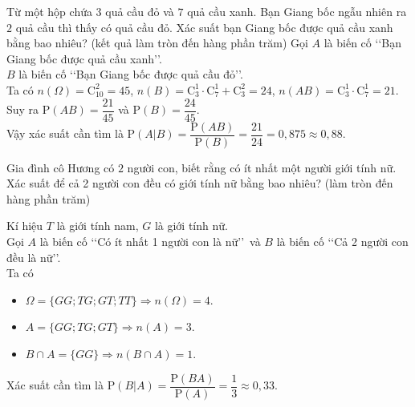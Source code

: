 \begin{bt}%
	Từ một hộp chứa $3$ quả cầu đỏ và $7$ quả cầu xanh. Bạn Giang bốc ngẫu nhiên ra $2$ quả cầu thì thấy có quả cầu đỏ. Xác suất bạn Giang bốc được quả cầu xanh bằng bao nhiêu? (kết quả làm tròn đến hàng phần trăm)
	\loigiai
	{
		Gọi $A$ là biến cố \lq\lq Bạn Giang bốc được quả cầu xanh\rq\rq.\\
		$B$ là biến cố \lq\lq Bạn Giang bốc được quả cầu đỏ\rq\rq.\\
		Ta có $n(\Omega)= \mathrm{C}_{10}^2=45$, $n(B)= \mathrm{C}_3^1 \cdot \mathrm{C}_7^1 + \mathrm{C}_3^2= 24$, $n(AB)= \mathrm{C}_3^1\cdot \mathrm{C}_7^1=21$.\\
		Suy ra $\mathrm{P}(AB)= \dfrac{21}{45}$ và $\mathrm{P}(B)= \dfrac{24}{45}$.\\
		Vậy xác suất cần tìm là $\mathrm{P}(A|B)= \dfrac{\mathrm{P}(AB)}{\mathrm{P}(B)}= \dfrac{21}{24}= 0{,}875 \approx 0{,}88$.
	}
\end{bt}

\begin{bt}%
	Gia đình cô Hương có $2$ người con, biết rằng có ít nhất một người giới tính nữ. Xác suất để cả 2 người con đều có giới tính nữ bằng bao nhiêu? (làm tròn đến hàng phần trăm)
	\loigiai
	{
		Kí hiệu $T$ là giới tính nam, $G$ là giới tính nữ.\\
		Gọi $A$ là biến cố \lq\lq Có ít nhất 1 người con là nữ\rq\rq\ và $B$ là biến cố \lq\lq Cả 2 người con đều là nữ\rq\rq.\\ Ta có
		\begin{itemize}
			\item $\Omega= \{GG; TG; GT; TT\} \Rightarrow n(\Omega)= 4$.
			\item $A= \{GG; TG; GT\} \Rightarrow n(A)=3$.
			\item $B\cap A=\{GG\} \Rightarrow n(B \cap A)=1$.
		\end{itemize}		
		Xác suất cần tìm là $\mathrm{P}(B|A)= \dfrac{\mathrm{P}(BA)}{\mathrm{P}(A)}= \dfrac{1}{3}\approx 0{,}33$.
	}
\end{bt}

